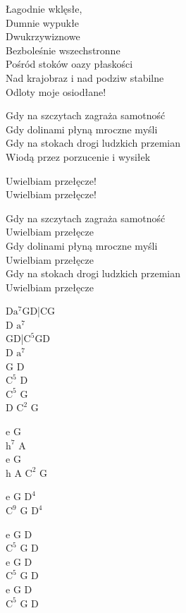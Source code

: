 \begin{text}
    \hfill\break
Łagodnie wklęsłe,\\
Dumnie wypukłe\\
Dwukrzywiznowe\\
Bezboleśnie wszechstronne\\
Pośród stoków oazy płaskości\\
Nad krajobraz i nad podziw stabilne\\
Odloty moje osiodłane!

Gdy na szczytach zagraża samotność\\
Gdy dolinami płyną mroczne myśli\\
Gdy na stokach drogi ludzkich przemian\\
Wiodą przez porzucenie i wysiłek

Uwielbiam przełęcze!\\
Uwielbiam przełęcze!

Gdy na szczytach zagraża samotność\\
Uwielbiam przełęcze\\
Gdy dolinami płyną mroczne myśli\\
Uwielbiam przełęcze\\
Gdy na stokach drogi ludzkich przemian\\
Uwielbiam przełęcze
\end{text}
\begin{chord}
    D$\mathrm{a^7}$GD|CG\\
    D $\mathrm{a^7}$\\
    GD|$\mathrm{C^5}$GD\\
    D $\mathrm{a^7}$\\
    G D\\
    $\mathrm{C^5}$ D\\
    $\mathrm{C^5}$ G\\
    D $\mathrm{C^2}$ G

    e G\\
    $\mathrm{h^7}$ A\\
    e G\\
    h A $\mathrm{C^2}$ G

    e G $\mathrm{D^4}$\\
    $\mathrm{C^9}$ G $\mathrm{D^4}$

    e G D\\
    $\mathrm{C^5}$ G D\\
    e G D\\
    $\mathrm{C^5}$ G D\\
    e G D\\
    $\mathrm{C^5}$ G D
\end{chord}
